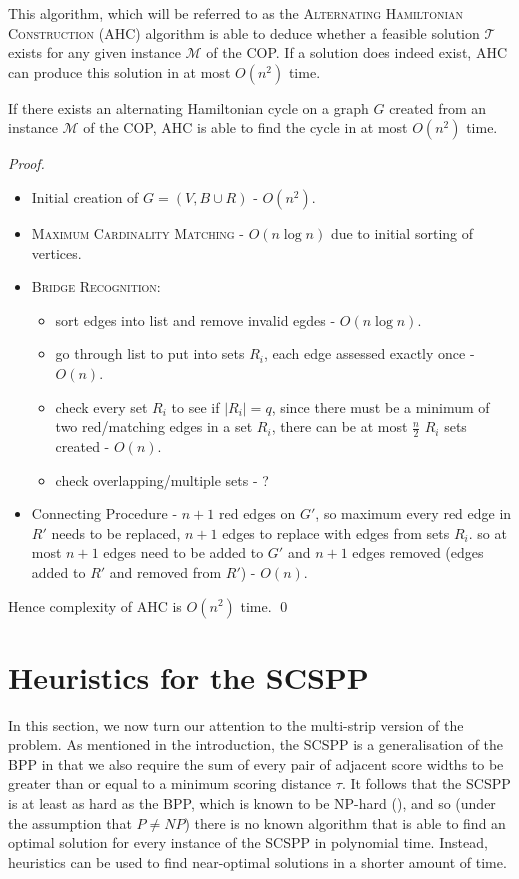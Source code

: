 \documentclass[oribibl]{llncs}
\begin{document}
This algorithm, which will be referred to as the \textsc{Alternating Hamiltonian Construction} (AHC) algorithm is able to deduce whether a feasible solution $\mathcal{T}$ exists for any given instance $\mathcal{M}$ of the COP. If a solution does indeed exist, AHC can produce this solution in at most $O(n^2)$ time.

\begin{theorem}
	\label{thm:copsoln}
	If there exists an alternating Hamiltonian cycle on a graph $G$ created from an instance $\mathcal{M}$ of the COP, AHC is able to find the cycle in at most $O(n^2)$ time.
\end{theorem}
\begin{proof}
	\begin{itemize}
		\item Initial creation of $G = (V, B \cup R)$ - $O(n^2)$.
		\item \textsc{Maximum Cardinality Matching} - $O(n\log n)$ due to initial sorting of vertices.
		\item \textsc{Bridge Recognition}:
		\begin{itemize}
			\item sort edges into list and remove invalid egdes - $O(n \log n)$.
			\item go through list to put into sets $R_i$, each edge assessed exactly once - $O(n)$.
			\item check every set $R_i$ to see if $|R_i| = q$, since there must be a minimum of two red/matching edges in a set $R_i$, there can be at most $\frac{n}{2}$ $R_i$ sets created - $O(n)$.
			\item check overlapping/multiple sets - ?
		\end{itemize}	
		\item Connecting Procedure - $n+1$ red edges on $G'$, so maximum every red edge in $R'$ needs to be replaced, $n+1$ edges to replace with edges from sets $R_i$. so at most $n+1$ edges need to be added to $G'$ and $n+1$ edges removed (edges added to $R'$ and removed from $R'$) - $O(n)$.
	\end{itemize}
	Hence complexity of AHC is $O(n^2)$ time.
	\qed
\end{proof}


\section{Heuristics for the SCSPP}
\label{sec:scsppsoln}

In this section, we now turn our attention to the multi-strip version of the problem. As mentioned in the introduction, the SCSPP is a generalisation of the BPP in that we also require the sum of every pair of adjacent score widths to be greater than or equal to a minimum scoring distance $\tau$. It follows that the SCSPP is at least as hard as the BPP, which is known to be NP-hard (\citealp{garey1979}), and so (under the assumption that $P \neq NP$) there is no known algorithm that is able to find an optimal solution for every instance of the SCSPP in polynomial time. Instead, heuristics can be used to find near-optimal solutions in a shorter amount of time.
\end{document}
